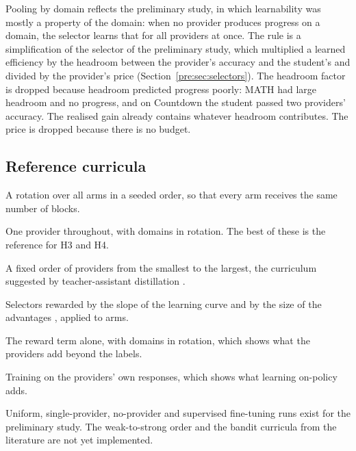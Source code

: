 Pooling by domain reflects the preliminary study, in which learnability was mostly a
property of the domain: when no provider produces progress on a domain, the selector
learns that for all providers at once. The rule is a simplification of the selector of
the preliminary study, which multiplied a learned efficiency by the headroom between the
provider's accuracy and the student's and divided by the provider's price
(Section~\ref{pre:sec:selectors}). The headroom factor is dropped because headroom
predicted progress poorly: MATH had large headroom and no progress, and on Countdown the
student passed two providers' accuracy. The realised gain already contains whatever
headroom contributes. The price is dropped because there is no budget.

\subsection{Reference curricula}
\label{imp:sec:baselines}

\begin{description}[itemsep=3pt,topsep=4pt]
  \item[Uniform.] A rotation over all arms in a seeded order, so that every arm receives
    the same number of blocks.
  \item[Single provider.] One provider throughout, with domains in rotation. The best of
    these is the reference for H3 and H4.
  \item[Weak to strong.] A fixed order of providers from the smallest to the largest, the
    curriculum suggested by teacher-assistant distillation \autocite{mirzadeh_ta_2020}.
  \item[Bandit curricula from the literature.] Selectors rewarded by the slope of the
    learning curve \autocite{matiisen_tscl_2017} and by the size of the advantages
    \autocite{chen_sec_2025}, applied to arms.
  \item[No provider.] The reward term alone, with domains in rotation, which shows what
    the providers add beyond the labels.
  \item[Supervised fine-tuning.] Training on the providers' own responses, which shows
    what learning on-policy adds.
\end{description}

Uniform, single-provider, no-provider and supervised fine-tuning runs exist for the
preliminary study. The weak-to-strong order and the bandit curricula from the literature
are not yet implemented.

